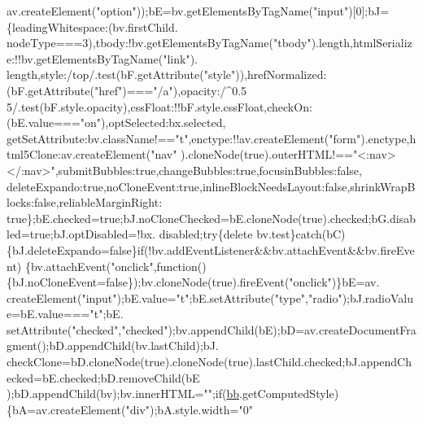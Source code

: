 \begin{DoxyCode}
      av.createElement(\textcolor{stringliteral}{"option"}));bE=bv.getElementsByTagName(\textcolor{stringliteral}{"input"})[0];bJ=\{leadingWhitespace:(bv.firstChild.
      nodeType===3),tbody:!bv.getElementsByTagName(\textcolor{stringliteral}{"tbody"}).length,htmlSerialize:!!bv.getElementsByTagName(\textcolor{stringliteral}{"link"}).
      length,style:/top/.test(bF.getAttribute(\textcolor{stringliteral}{"style"})),hrefNormalized:(bF.getAttribute(\textcolor{stringliteral}{"href"})===\textcolor{stringliteral}{"/a"}),opacity:/^0.5
      5/.test(bF.style.opacity),cssFloat:!!bF.style.cssFloat,checkOn:(bE.value===\textcolor{stringliteral}{"on"}),optSelected:bx.selected,
      getSetAttribute:bv.className!==\textcolor{stringliteral}{"t"},enctype:!!av.createElement(\textcolor{stringliteral}{"form"}).enctype,html5Clone:av.createElement(\textcolor{stringliteral}{"nav"}
      ).cloneNode(\textcolor{keyword}{true}).outerHTML!==\textcolor{stringliteral}{"<:nav></:nav>"},submitBubbles:\textcolor{keyword}{true},changeBubbles:\textcolor{keyword}{true},focusinBubbles:\textcolor{keyword}{false},
      deleteExpando:\textcolor{keyword}{true},noCloneEvent:\textcolor{keyword}{true},inlineBlockNeedsLayout:\textcolor{keyword}{false},shrinkWrapBlocks:\textcolor{keyword}{false},reliableMarginRight:\textcolor{keyword}{
      true}\};bE.checked=\textcolor{keyword}{true};bJ.noCloneChecked=bE.cloneNode(\textcolor{keyword}{true}).checked;bG.disabled=\textcolor{keyword}{true};bJ.optDisabled=!bx.
      disabled;\textcolor{keywordflow}{try}\{\textcolor{keyword}{delete} bv.test\}\textcolor{keywordflow}{catch}(bC)\{bJ.deleteExpando=\textcolor{keyword}{false}\}\textcolor{keywordflow}{if}(!bv.addEventListener&&bv.attachEvent&&bv.fireEvent)
      \{bv.attachEvent(\textcolor{stringliteral}{"onclick"},\textcolor{keyword}{function}()\{bJ.noCloneEvent=\textcolor{keyword}{false}\});bv.cloneNode(\textcolor{keyword}{true}).fireEvent(\textcolor{stringliteral}{"onclick"})\}bE=av.
      createElement(\textcolor{stringliteral}{"input"});bE.value=\textcolor{stringliteral}{"t"};bE.setAttribute(\textcolor{stringliteral}{"type"},\textcolor{stringliteral}{"radio"});bJ.radioValue=bE.value===\textcolor{stringliteral}{"t"};bE.
      setAttribute(\textcolor{stringliteral}{"checked"},\textcolor{stringliteral}{"checked"});bv.appendChild(bE);bD=av.createDocumentFragment();bD.appendChild(bv.lastChild);bJ.
      checkClone=bD.cloneNode(\textcolor{keyword}{true}).cloneNode(\textcolor{keyword}{true}).lastChild.checked;bJ.appendChecked=bE.checked;bD.removeChild(bE
      );bD.appendChild(bv);bv.innerHTML=\textcolor{stringliteral}{""};\textcolor{keywordflow}{if}(\hyperlink{docs_2_programmer's_manual_2html_2jquery_8js_a1d6558865876e1c8cca029fce41a4bdb}{bb}.getComputedStyle)\{bA=av.createElement(\textcolor{stringliteral}{"div"});bA.style.width=\textcolor{stringliteral}{"0"}

\end{DoxyCode}
